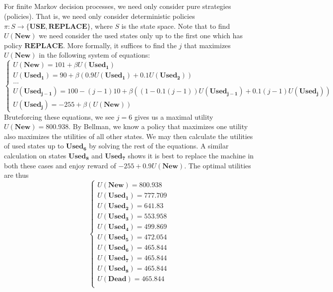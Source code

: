\documentclass{article}
\begin{document}
\subsection{}
For finite Markov decision processes, we need only consider pure strategies (policies). That is, we need only consider deterministic policies $\pi: S \rightarrow \{\mathbf{USE},\mathbf{REPLACE}\}$, where $S$ is the state space. Note that to find $U(\mathbf{New})$ we need consider the used states only up to the first one which has policy $\mathbf{REPLACE}$. More formally, it suffices to find the $j$ that maximizes $U(\mathbf{New})$ in the following system of equations:
\begin{equation*}
\begin{cases}
U(\mathbf{New}) = 101 + \beta U(\mathbf{Used_1})\\
U(\mathbf{Used_1}) = 90 + \beta(0.9U(\mathbf{Used_1})+0.1U(\mathbf{Used_2}))\\
\dots\\
U(\mathbf{Used_{j-1}}) = 100 - (j-1)10 + \beta((1-0.1(j-1))U(\mathbf{Used_{j-1}})+0.1(j-1)U(\mathbf{Used_j}))\\
U(\mathbf{Used_j}) = -255 + \beta(U(\mathbf{New}))
\end{cases}
\end{equation*}
Bruteforcing these equations, we see $j=6$ gives us a maximal utility $U(\mathbf{New}) = 800.938$. By Bellman, we know a policy that maximizes one utility also maximizes the utilities of all other states. We may then calculate the utilities of used states up to $\mathbf{Used_6}$ by solving the rest of the equations. A similar calculation on states $\mathbf{Used_8}$ and $\mathbf{Used_7}$ shows it is best to replace the machine in both these cases and enjoy reward of $-255+0.9U(\mathbf{New})$. The optimal utilities are thus
\begin{equation*}
\begin{cases}
U(\mathbf{New}) = 800.938\\
U(\mathbf{Used_1}) = 777.709\\
U(\mathbf{Used_2}) = 641.83\\
U(\mathbf{Used_3}) = 553.958\\
U(\mathbf{Used_4}) = 499.869\\
U(\mathbf{Used_5}) = 472.054\\
U(\mathbf{Used_6}) = 465.844\\
U(\mathbf{Used_7}) = 465.844\\
U(\mathbf{Used_8}) = 465.844\\
U(\mathbf{Dead}) = 465.844\\
\end{cases}
\end{equation*}
\end{document}

